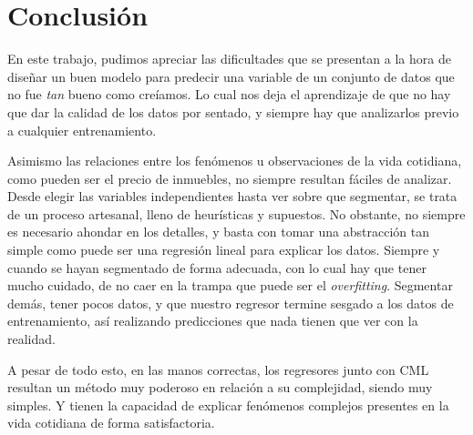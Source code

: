     

\section{Conclusión}

En este trabajo, pudimos apreciar las dificultades que se presentan a la hora de diseñar un buen modelo para predecir una variable de un conjunto de datos que no fue \textit{tan} bueno como creíamos. Lo cual nos deja el aprendizaje de que no hay que dar la calidad de los datos por sentado, y siempre hay que analizarlos previo a cualquier entrenamiento.

Asimismo las relaciones entre los fenómenos u observaciones de la vida cotidiana, como pueden ser el precio de inmuebles, no siempre resultan fáciles de analizar. Desde elegir las variables independientes hasta ver sobre que segmentar, se trata de un proceso artesanal, lleno de heurísticas y supuestos. No obstante, no siempre es necesario ahondar en los detalles, y basta con tomar una abstracción tan simple como puede ser una regresión lineal para explicar los datos. Siempre y cuando se hayan segmentado de forma adecuada, con lo cual hay que tener mucho cuidado, de no caer en la trampa que puede ser el \textit{overfitting}. Segmentar demás, tener pocos datos, y que nuestro regresor termine sesgado a los datos de entrenamiento, así realizando predicciones que nada tienen que ver con la realidad.

A pesar de todo esto, en las manos correctas, los regresores junto con CML resultan un método muy poderoso en relación a su complejidad, siendo muy simples. Y tienen la capacidad de  explicar fenómenos complejos presentes en la vida cotidiana de forma satisfactoria.
